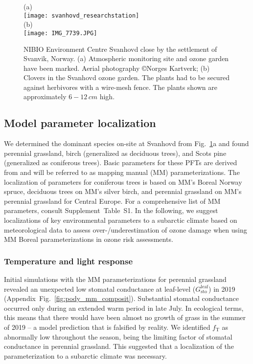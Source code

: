 \documentclass[bg, manuscript]{copernicus}
\begin{document}
\begin{figure}[t]
  \centering
  (a)\\
  \texttt{[image: svanhovd\_researchstation]}\\
  (b)\\
  \texttt{[image: IMG\_7739.JPG]}
  \caption{NIBIO Environment Centre Svanhovd close by the settlement of Svanvik, Norway. (a) Atmospheric monitoring site and ozone garden have been marked. Aerial photography \copyright Norges Kartverk; (b) Clovers in the Svanhovd ozone garden. The plants had to be secured against herbivores with a wire-mesh fence. The plants shown are approximately $6-12\,\unit{cm}$ high.}
  \label{fig:svanhovd_research_station}
\end{figure}

\subsection{Model parameter localization}
\label{sec:localization}

We determined the dominant species on-site at Svanhovd from Fig.~\ref{fig:svanhovd_research_station}a and found perennial grassland, birch (generalized as deciduous trees), and Scots pine (generalized as coniferous trees). Basic parameters for these PFTs are derived from \citet{EP:Simpson2007,GCB:Mills2011,ICP:MappingManual2017} and will be referred to as mapping manual (MM) parameterizations. The localization of parameters for coniferous trees is based on MM's Boreal Norway spruce, deciduous trees on MM's silver birch, and perennial grassland on MM's perennial grassland for Central Europe. For a comprehensive list of MM parameters, consult Supplement~Table~S1. In the following, we suggest localizations of key environmental parameters to a subarctic climate based on meteorological data to assess over-/underestimation of ozone damage when using MM Boreal parameterizations in ozone risk assessments.

\subsubsection{Temperature and light response}

Initial simulations with the MM parameterizations for perennial grassland revealed an unexpected low stomatal conductance at leaf-level ($G_\mathrm{sto}^\mathrm{leaf}$) in 2019 (Appendix~Fig.~\ref{fig:pody_mm_composit}). Substantial stomatal conductance occurred only during an extended warm period in late July. In ecological terms, this means that there would have been almost no growth of grass in the summer of 2019 -- a model prediction that is falsified by reality. We identified $f_\mathrm{T}$ as abnormally low throughout the season, being the limiting factor of stomatal conductance in perennial grassland. This suggested that a localization of the parameterization to a subarctic climate was necessary.
\end{document}
